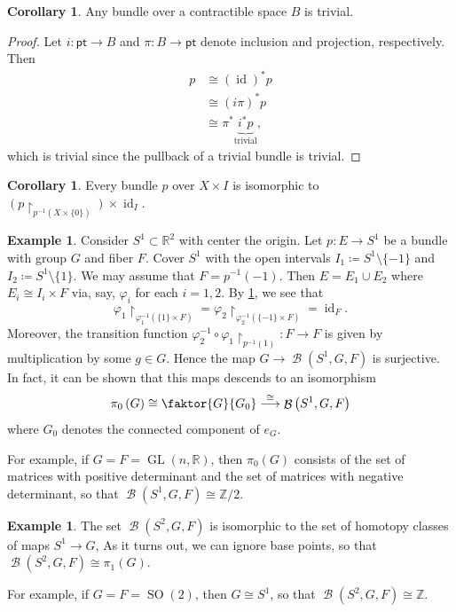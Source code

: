 \documentclass[10pt,letterpaper,cm]{nupset}
\theoremstyle{definition}
\newtheorem{exmp}[defn]{Example}
\theoremstyle{theorem}
\newtheorem{corollary}[defn]{Corollary}
\theoremstyle{remark}
\newcommand{\R}{\mathbb{R}}
\newcommand{\Z}{\mathbb Z}
\newcommand{\1}{\mathbb{1}}
\newcommand{\0}{\vec 0}
\newcommand{\pt}{\mathsf{pt}}
\DeclareMathOperator{\id}{id}
\DeclareMathOperator{\GL}{GL}
\DeclareMathOperator{\SO}{SO}
\DeclareMathOperator{\B}{\mathcal{B}}
\begin{document}
\begin{corollary}
Any bundle over a contractible space $B$ is trivial.
\end{corollary}
\begin{proof}
Let $i : \pt \to B$ and $\pi : B \to \pt$ denote inclusion and projection, respectively. Then 
\begin{align*}
p &  \cong \left(\id\right)^{\ast}{p}
\\ & \cong \left(i{\pi}\right)^{\ast}{p}
\\ & \cong \pi^{\ast}\underbrace{{i^{\ast}}{p}}_{\text{trivial}},
\end{align*}
which is trivial since the pullback of a trivial bundle is trivial.
\end{proof}

\begin{corollary}\label{restiso}
Every bundle $p$ over $X\times I$ is isomorphic to $\left(p\restriction_{p^{-1}\left(X\times \{0\}\right)}\right) \times \id_I$.
\end{corollary}

\begin{exmp}
Consider $S^1 \subset \R^2$ with center the origin. Let $p: E \to S^1$ be a bundle with group $G$ and fiber $F$. Cover $S^1$ with the open intervals $I_1 \coloneqq S^1\setminus \{{-}1\}$ and $I_2 \coloneqq S^1\setminus \{1\}$. We may assume that $F= p^{-1}\left({-}1\right)$. Then $E = E_1 \cup E_2$ where $ E_i \cong I_i \times F$ via, say, $\varphi_i$ for each $i=1,2$. By \cref{restiso}, we see that $$\varphi_1\restriction_{\varphi_1^{-1}\left(\{1\} \times F\right)} = \varphi_2\restriction_{\varphi_2^{-1}\left(\{{-}1\} \times F\right)}= \id_F.$$ Moreover, the transition function $\varphi_2^{-1} \circ \varphi_1\restriction_{p^{-1}\left(1\right)} : F \to F$ is given by multiplication by some $g\in G$. Hence the map $G \to \B\left(S^1, G, F\right)$ is surjective. In fact, it can be shown that this maps descends to an isomorphism
$$\pi_0\left(G\right) \cong \faktor{G}{G_0} \overset{\cong}{\longrightarrow} \B\left(S^1, G, F\right)$$ 
where $G_0$ denotes the connected component of $e_G$. 

\smallskip

For example, if $G=F = \GL\left(n, \R\right)$, then $\pi_0(G)$ consists of the set of matrices with positive determinant and the set of matrices with negative determinant, so that $\B\left(S^1, G, F\right) \cong \Z/2$.
\end{exmp}

\begin{exmp}
The set $\B\left(S^2, G, F \right)$ is isomorphic to the set of homotopy classes of maps $S^1 \to G$, As it turns out, we can ignore base points, so that  $\B\left(S^2, G, F \right) \cong \pi_1\left(G\right)$. 

\smallskip

For example, if $G = F = \SO(2)$, then $G\cong S^1$, so that $\B\left(S^2, G, F \right) \cong \Z$.
\end{exmp}
\end{document}
